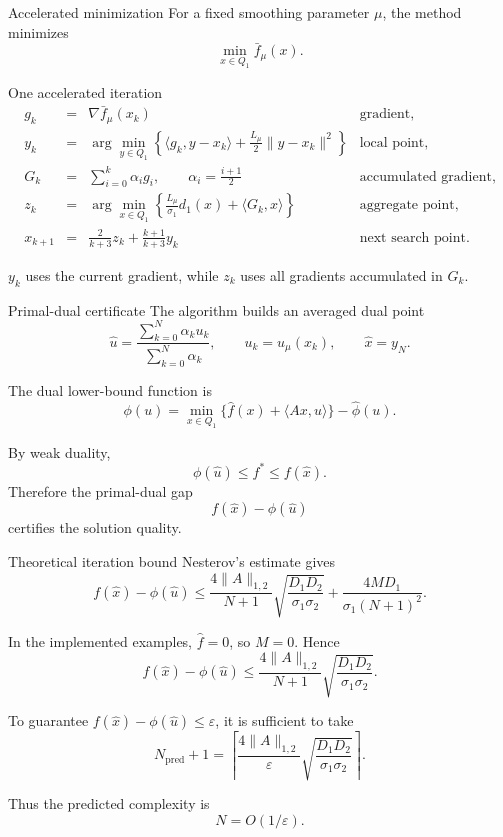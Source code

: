 \documentclass[aspectratio=169]{beamer}
\begin{document}
\begin{frame}[t]{Accelerated minimization}
\scriptsize
For a fixed smoothing parameter $\mu$, the method minimizes
\[
    \min_{x\in Q_1}\bar f_\mu(x).
\]

\vspace{-0.5em}
\begin{block}{One accelerated iteration}
\[
\begin{array}{rcll}
 g_k &=& \nabla\bar f_\mu(x_k) & \text{gradient},\\[0.25em]
 y_k &=& \displaystyle\arg\min_{y\in Q_1}\left\{\langle g_k,y-x_k\rangle+\frac{L_\mu}{2}\|y-x_k\|^2\right\} & \text{local point},\\[0.45em]
 G_k &=& \displaystyle\sum_{i=0}^{k}\alpha_i g_i,\qquad \alpha_i=\frac{i+1}{2} & \text{accumulated gradient},\\[0.45em]
 z_k &=& \displaystyle\arg\min_{x\in Q_1}\left\{\frac{L_\mu}{\sigma_1}d_1(x)+\langle G_k,x\rangle\right\} & \text{aggregate point},\\[0.65em]
 x_{k+1} &=& \displaystyle\frac{2}{k+3}z_k+\frac{k+1}{k+3}y_k & \text{next search point}.
\end{array}
\]
\end{block}

\vspace{-0.2em}
$y_k$ uses the current gradient, while $z_k$ uses all gradients accumulated in $G_k$.
\end{frame}

\begin{frame}{Primal-dual certificate}
\small
  The algorithm builds an averaged dual point
  \[
      \hat u=\frac{\sum_{k=0}^{N}\alpha_k u_k}{\sum_{k=0}^{N}\alpha_k},
      \qquad u_k=u_\mu(x_k),
      \qquad \hat x=y_N.
  \]

  The dual lower-bound function is
  \[
      \phi(u)=\min_{x\in Q_1}
      \{\hat f(x)+\langle Ax,u\rangle\}-\hat\phi(u).
  \]


  \vspace{0.3em}
  By weak duality,
  \[
      \phi(\hat u)\le f^*\le f(\hat x).
  \]
  Therefore the primal-dual gap
  \[
      f(\hat x)-\phi(\hat u)
  \]
  certifies the solution quality.
\end{frame}

\begin{frame}{Theoretical iteration bound}
\small
  Nesterov's estimate gives
  \[
      f(\hat x)-\phi(\hat u)
      \le
      \frac{4\|A\|_{1,2}}{N+1}
      \sqrt{\frac{D_1D_2}{\sigma_1\sigma_2}}
      +
      \frac{4MD_1}{\sigma_1(N+1)^2}.
  \]

  In the implemented examples, $\hat f=0$, so $M=0$. Hence
  \[
      f(\hat x)-\phi(\hat u)
      \le
      \frac{4\|A\|_{1,2}}{N+1}
      \sqrt{\frac{D_1D_2}{\sigma_1\sigma_2}}.
  \]

  To guarantee $f(\hat x)-\phi(\hat u)\le\varepsilon$, it is sufficient to take
  \[
      N_{\mathrm{pred}}+1=
      \left\lceil
      \frac{4\|A\|_{1,2}}{\varepsilon}
      \sqrt{\frac{D_1D_2}{\sigma_1\sigma_2}}
      \right\rceil.
  \]

  Thus the predicted complexity is
  \[
      N=O(1/\varepsilon).
  \]
\end{frame}
\end{document}
